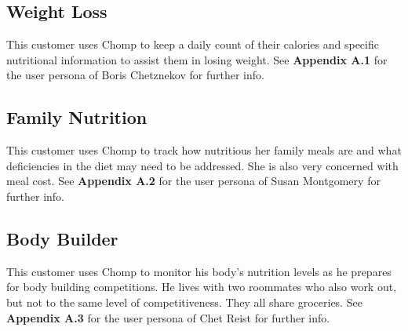 \documentclass[a4paper,12pt]{article}
\begin{document}
\subsection{Weight Loss}
This customer uses Chomp to keep a daily count of their calories and specific nutritional information to assist them in losing weight.  See \textbf{Appendix A.1} for the user persona of Boris Chetznekov for further info.
\subsection{Family Nutrition}
This customer uses Chomp to track how nutritious her family meals are and what deficiencies in the diet may need to be addressed.  She is also very concerned with meal cost.  See \textbf{Appendix A.2} for the user persona of Susan Montgomery for further info.
\subsection{Body Builder}
This customer uses Chomp to monitor his body's nutrition levels as he prepares for body building competitions.  He lives with two roommates who also work out, but not to the same level of competitiveness.  They all share groceries.  See \textbf{Appendix A.3} for the user persona of Chet Reist for further info.
\end{document}
